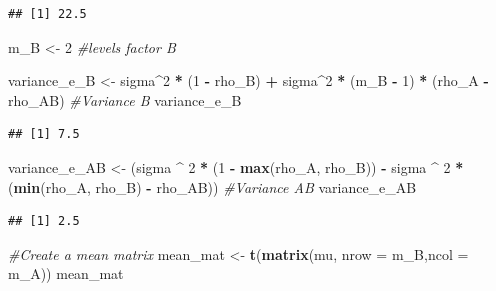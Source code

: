 \documentclass[]{book}
\newenvironment{Shaded}{\begin{snugshade}}{\end{snugshade}}
\newcommand{\CommentTok}[1]{\textcolor[rgb]{0.56,0.35,0.01}{\textit{#1}}}
\newcommand{\DataTypeTok}[1]{\textcolor[rgb]{0.13,0.29,0.53}{#1}}
\newcommand{\DecValTok}[1]{\textcolor[rgb]{0.00,0.00,0.81}{#1}}
\newcommand{\KeywordTok}[1]{\textcolor[rgb]{0.13,0.29,0.53}{\textbf{#1}}}
\newcommand{\NormalTok}[1]{#1}
\newcommand{\OperatorTok}[1]{\textcolor[rgb]{0.81,0.36,0.00}{\textbf{#1}}}
\newcommand{\StringTok}[1]{\textcolor[rgb]{0.31,0.60,0.02}{#1}}
\begin{document}
\begin{verbatim}
## [1] 22.5
\end{verbatim}

\begin{Shaded}
\begin{Highlighting}[]
\NormalTok{m_B <-}\StringTok{ }\DecValTok{2} \CommentTok{#levels factor B}

\NormalTok{variance_e_B <-}\StringTok{ }\NormalTok{sigma}\OperatorTok{^}\DecValTok{2} \OperatorTok{*}\StringTok{ }\NormalTok{(}\DecValTok{1} \OperatorTok{-}\StringTok{ }\NormalTok{rho_B) }\OperatorTok{+}\StringTok{ }
\StringTok{  }\NormalTok{sigma}\OperatorTok{^}\DecValTok{2} \OperatorTok{*}\StringTok{ }\NormalTok{(m_B }\OperatorTok{-}\StringTok{ }\DecValTok{1}\NormalTok{) }\OperatorTok{*}\StringTok{ }\NormalTok{(rho_A }\OperatorTok{-}\StringTok{ }\NormalTok{rho_AB)}
\CommentTok{#Variance B}
\NormalTok{variance_e_B}
\end{Highlighting}
\end{Shaded}

\begin{verbatim}
## [1] 7.5
\end{verbatim}

\begin{Shaded}
\begin{Highlighting}[]
\NormalTok{variance_e_AB <-}
\StringTok{  }\NormalTok{(sigma }\OperatorTok{^}\StringTok{ }\DecValTok{2} \OperatorTok{*}\StringTok{ }\NormalTok{(}\DecValTok{1} \OperatorTok{-}\StringTok{ }\KeywordTok{max}\NormalTok{(rho_A, rho_B)) }\OperatorTok{-}\StringTok{ }
\StringTok{     }\NormalTok{sigma }\OperatorTok{^}\StringTok{ }\DecValTok{2} \OperatorTok{*}\StringTok{ }\NormalTok{(}\KeywordTok{min}\NormalTok{(rho_A, rho_B) }\OperatorTok{-}\StringTok{ }\NormalTok{rho_AB)) }
\CommentTok{#Variance AB}
\NormalTok{variance_e_AB}
\end{Highlighting}
\end{Shaded}

\begin{verbatim}
## [1] 2.5
\end{verbatim}

\begin{Shaded}
\begin{Highlighting}[]
\CommentTok{#Create a mean matrix}
\NormalTok{mean_mat <-}\StringTok{ }\KeywordTok{t}\NormalTok{(}\KeywordTok{matrix}\NormalTok{(mu, }\DataTypeTok{nrow =}\NormalTok{ m_B,}\DataTypeTok{ncol =}\NormalTok{ m_A)) }
\NormalTok{mean_mat}
\end{Highlighting}
\end{Shaded}
\end{document}
